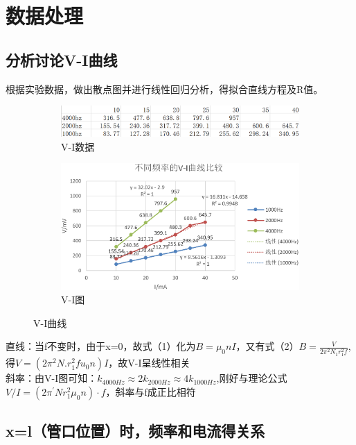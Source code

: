 \documentclass[12pt,a4paper]{article}
\begin{document}
	\section{数据处理}
	\subsection{分析讨论V-I曲线}
	根据实验数据，做出散点图并进行线性回归分析，得拟合直线方程及R值。
	\begin{figure}[H]
		\centering
		\begin{subfigure}[b]{0.4\textwidth}
			\centering
			\includegraphics[width=\textwidth]{V-I数据.png}
			\caption{V-I数据}
			\label{fig:chart-amplitude}
		\end{subfigure}
		\hfill
		\begin{subfigure}[b]{0.4\textwidth}
			\centering
			\includegraphics[width=\textwidth]{V-I图.png}
			\caption{V-I图}
			\label{fig:chart-frequency}
		\end{subfigure}
		\caption{V-I曲线}
		\label{fig:chart1}
	\end{figure}	
	直线：当f不变时，由于x=0，故式（1）化为$B=\mu_0 n I$，又有式（2）$B = \frac{V}{2\pi^2N_1r_1^2f}$,得$V=(2\pi^{2}N.r_{1}^{2}fu_{0}n)I$，故V-I呈线性相关\\
	斜率：由V-I图可知：$k_{4000Hz}\approx2k_{2000Hz}\approx4k_{1000Hz}$,刚好与理论公式$V/I=(2\pi^{\prime}Nr_{1}^{2}\mu_{0}n)\cdot f$，斜率与f成正比相符

	\subsection{x=l（管口位置）时，频率和电流得关系}
\end{document}
